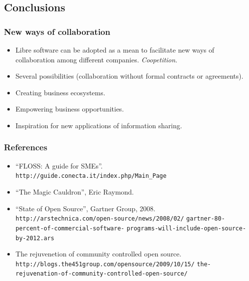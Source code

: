 % 
\subsection{Conclusions}

\begin{frame}
 \frametitle{New ways of collaboration}
 \begin{itemize}
  \item Libre software can be adopted as a mean to facilitate new ways of collaboration
among different companies. \textit{Coopetition}.
  \item Several possibilities (collaboration without formal contracts or agreements).
  \item Creating business ecosystems.
  \item Empowering business opportunities.
  \item Inspiration for new applications of information sharing.
 \end{itemize}
\end{frame}


\begin{frame}
 \frametitle{References}
 \begin{itemize}
  \item ``FLOSS: A guide for SMEs''.
\texttt{http://guide.conecta.it/index.php/Main\_Page}
  \item ``The Magic Cauldron'', Eric Raymond.
  \item ``State of Open Source'', Gartner Group, 2008.
\texttt{http://arstechnica.com/open-source/news/2008/02/}
\texttt{gartner-80-percent-of-commercial-software-}
\texttt{programs-will-include-open-source-by-2012.ars}
  \item The rejuvenetion of community controlled open source.
\texttt{http://blogs.the451group.com/opensource/2009/10/15/}
\texttt{the-rejuvenation-of-community-controlled-open-source/}
 \end{itemize}

\end{frame}

